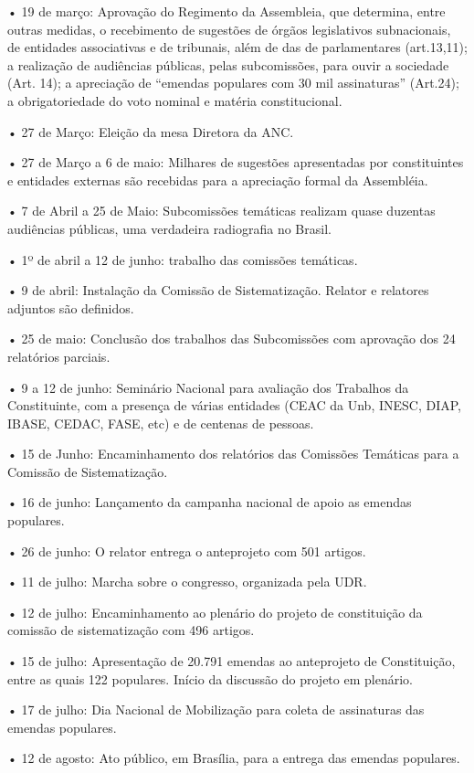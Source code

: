 • 19 de março: Aprovação do Regimento da Assembleia, que determina,
entre outras medidas, o recebimento de sugestões de órgãos legislativos
subnacionais, de entidades associativas e de tribunais, além de das de
parlamentares (art.13,11); a realização de audiências públicas, pelas
subcomissões, para ouvir a sociedade (Art. 14); a apreciação de
``emendas populares com 30 mil assinaturas'' (Art.24); a obrigatoriedade
do voto nominal e matéria constitucional.

• 27 de Março: Eleição da mesa Diretora da ANC.

• 27 de Março a 6 de maio: Milhares de sugestões apresentadas por
constituintes e entidades externas são recebidas para a apreciação
formal da Assembléia.

• 7 de Abril a 25 de Maio: Subcomissões temáticas realizam quase
duzentas audiências públicas, uma verdadeira radiografia no Brasil.

• 1º de abril a 12 de junho: trabalho das comissões temáticas.

• 9 de abril: Instalação da Comissão de Sistematização. Relator e
relatores adjuntos são definidos.

• 25 de maio: Conclusão dos trabalhos das Subcomissões com aprovação dos
24 relatórios parciais.

• 9 a 12 de junho: Seminário Nacional para avaliação dos Trabalhos da
Constituinte, com a presença de várias entidades (CEAC da Unb, INESC,
DIAP, IBASE, CEDAC, FASE, etc) e de centenas de pessoas.

• 15 de Junho: Encaminhamento dos relatórios das Comissões Temáticas
para a Comissão de Sistematização.

• 16 de junho: Lançamento da campanha nacional de apoio as emendas
populares.

• 26 de junho: O relator entrega o anteprojeto com 501 artigos.

• 11 de julho: Marcha sobre o congresso, organizada pela UDR.

• 12 de julho: Encaminhamento ao plenário do projeto de constituição da
comissão de sistematização com 496 artigos.

• 15 de julho: Apresentação de 20.791 emendas ao anteprojeto de
Constituição, entre as quais 122 populares. Início da discussão do
projeto em plenário.

• 17 de julho: Dia Nacional de Mobilização para coleta de assinaturas
das emendas populares.

• 12 de agosto: Ato público, em Brasília, para a entrega das emendas
populares.

